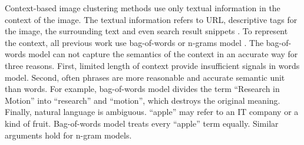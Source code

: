 
Context-based image clustering methods use only
textual information in the context of the image.
The textual information refers to URL, descriptive tags for the image,
the surrounding text and even search result snippets \cite{Jing2006}.
To represent the context, all previous work use bag-of-words or
n-grams model \cite{Jing2006}.
The bag-of-words model can not capture the semantics of the context
in an accurate way for three reasons.
First, limited length of context provide insufficient signals
in words model. Second, often phrases are more
reasonable and accurate semantic unit than words.
For example, bag-of-words model divides the term ``Research in Motion''
into ``research'' and ``motion'', which destroys the original meaning.
Finally, natural language is ambiguous. ``apple'' may refer
to an IT company or a kind of fruit.
Bag-of-words model treats every ``apple'' term
equally.
Similar arguments hold for n-gram models.


